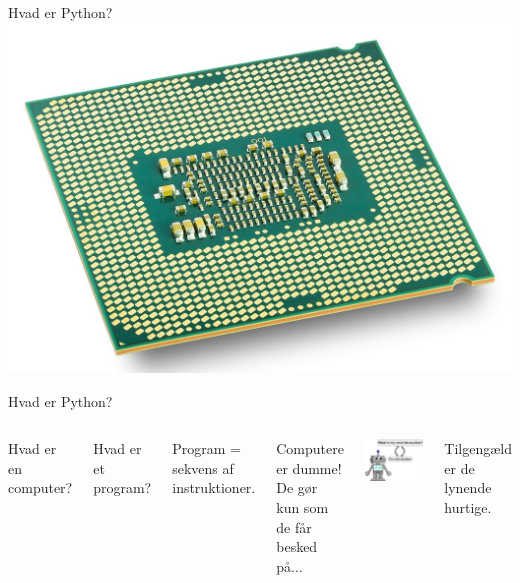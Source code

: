 \documentclass{beamer}
\begin{document}
\begin{frame}{Hvad er Python?}
\includegraphics[width=\textwidth]{cpu.jpg}
\end{frame}



\begin{frame}{Hvad er Python?}
\begin{center}
\begin{columns}
	Hvad er en computer?
	\pause

	Hvad er et program?
	\pause

	Program = sekvens af instruktioner.
	\pause
	
	Computere er dumme! De gør kun som de får besked på...
	\pause

	\includegraphics[width=\textwidth]{cpu-cartoon.png}
	\pause
	
	Tilgengæld er de lynende hurtige.
\end{columns}
\end{center}
\end{frame}
\end{document}
